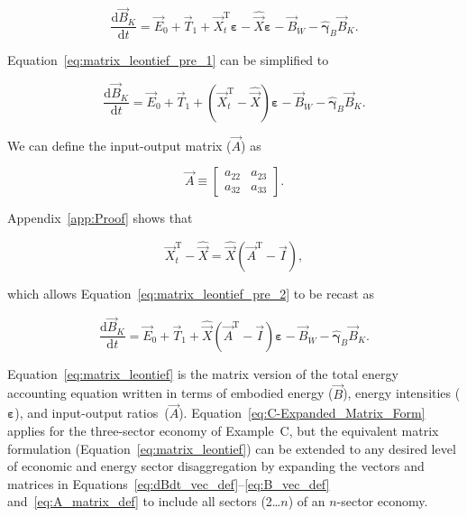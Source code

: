 \begin{equation} \label{eq:matrix_leontief_pre_1}
	\frac{\mathrm{d}\vec{B}_{K}}{\mathrm{d}t} 
	= \vec{E}_{0}
	+ \vec{T}_{1}
	+ \vec{X}_{t}^{\mathrm{T}}\boldsymbol{\varepsilon} 
	- \hat{\vec{X}}\boldsymbol{\varepsilon}
	- \vec{B}_{\dot{W}}
	- \hat{\boldsymbol{\gamma}}_{B} \vec{B}_{K}.
\end{equation}

\noindent{}Equation~\ref{eq:matrix_leontief_pre_1} can be simplified to

\begin{equation} \label{eq:matrix_leontief_pre_2}
	\frac{\mathrm{d}\vec{B}_{K}}{\mathrm{d}t} 
	= \vec{E}_{0}
	+ \vec{T}_{1}
	+ (\vec{X}_{t}^{\mathrm{T}} - \hat{\vec{X}})\boldsymbol{\varepsilon} 
	- \vec{B}_{\dot{W}}
	- \hat{\boldsymbol{\gamma}}_{B}\vec{B}_{K}.
\end{equation}

\noindent{}We can define the input-output matrix ($\vec{A}$) as

\begin{equation} \label{eq:A_matrix_def}
	\vec{A} 
	\equiv
	\begin{bmatrix}
		a_{22} & a_{23}	\\
		a_{32} & a_{33}	
	\end{bmatrix}.
\end{equation}

\noindent{}Appendix~\ref{app:Proof} shows that

\begin{equation} \label{eq:Xdifference1}
	\vec{X}_{t}^{\mathrm{T}} 
	- \hat{\vec{X}} 
	= \hat{\vec{X}} (\vec{A}^{\mathrm{T}} - \vec{I}),
\end{equation}

\noindent{}which allows Equation~\ref{eq:matrix_leontief_pre_2}
to be recast as

\begin{equation} \label{eq:matrix_leontief}
	\frac{\mathrm{d}\vec{B}_{K}}{\mathrm{d}t} 
	= \vec{E}_{0}
	+ \vec{T}_{1}
	+ \hat{\vec{X}} (\vec{A}^{\mathrm{T}} - \vec{I})\boldsymbol{\varepsilon} 
	- \vec{B}_{\dot{W}}
	- \hat{\boldsymbol{\gamma}}_{B}\vec{B}_{K}.
\end{equation}

\noindent{}Equation~\ref{eq:matrix_leontief} is the matrix version 
of the total energy accounting equation
written in terms of embodied energy ($\vec{B}$), 
energy intensities ($\boldsymbol{\varepsilon}$),
and input-output ratios~($\vec{A}$).
Equation~\ref{eq:C-Expanded_Matrix_Form} applies 
for the three-sector economy of Example~C, 
but the equivalent matrix formulation (Equation~\ref{eq:matrix_leontief}) 
can be extended to any desired level 
of economic and energy sector disaggregation 
by expanding the vectors and matrices in 
Equations~\ref{eq:dBdt_vec_def}--\ref{eq:B_vec_def}
and~\ref{eq:A_matrix_def} to include
all sectors (2\ldots $n$) of an $n$-sector economy.\cite{Bullard:1978vd,Casler1984}

